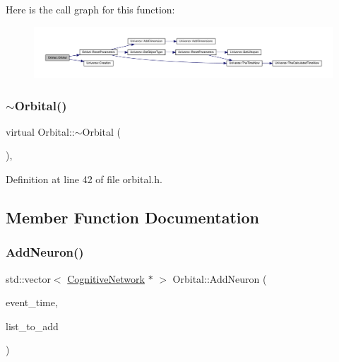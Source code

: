 Here is the call graph for this function\+:\nopagebreak
\begin{figure}[H]
\begin{center}
\leavevmode
\includegraphics[width=350pt]{class_orbital_ac54161437f3bd23cc1e6e85e702239c8_cgraph}
\end{center}
\end{figure}
\mbox{\label{class_orbital_af3c531d6dd6f3951dca836a2a9787c2c}} 
\subsubsection{\texorpdfstring{$\sim$\+Orbital()}{~Orbital()}}
{\footnotesize\ttfamily virtual Orbital\+::$\sim$\+Orbital (\begin{DoxyParamCaption}{ }\end{DoxyParamCaption})\hspace{0.3cm}{\ttfamily [inline]}, {\ttfamily [virtual]}}



Definition at line 42 of file orbital.\+h.



\subsection{Member Function Documentation}
\mbox{\label{class_orbital_a57480cdd63dd1bf731864f513767800d}} 
\subsubsection{\texorpdfstring{Add\+Neuron()}{AddNeuron()}}
{\footnotesize\ttfamily std\+::vector$<$ \mbox{\hyperlink{class_cognitive_network}{Cognitive\+Network}} $\ast$ $>$ Orbital\+::\+Add\+Neuron (\begin{DoxyParamCaption}\item[{std\+::chrono\+::time\+\_\+point$<$ \mbox{\hyperlink{universe_8h_a0ef8d951d1ca5ab3cfaf7ab4c7a6fd80}{Clock}} $>$}]{event\+\_\+time,  }\item[{std\+::vector$<$ \mbox{\hyperlink{class_cognitive_network}{Cognitive\+Network}} $\ast$$>$}]{list\+\_\+to\+\_\+add }\end{DoxyParamCaption})}




